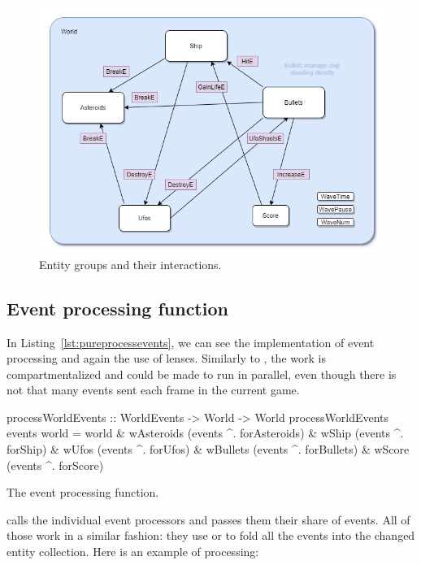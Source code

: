 \documentclass[
  digital, %
  color,   %
  table,   %
  oneside, %
  lof,     %
  lot,     %
]{fithesis3}
\begin{document}
{%
\begin{figure}
    \centering
    \includegraphics[width=\textwidth]{images/entity-relationships-transparent-bg.png}
    \caption{Entity groups and their interactions.}
    \label{fig:entitygroups}
\end{figure}



\subsection{Event processing function}

In Listing~\ref{lst:pureprocessevents}, we can see the implementation of
event processing and again the use of lenses.
Similarly to , the work is compartmentalized
and could be made to run in parallel, even though there is not that many
events sent each frame in the current game.
\begin{listing}
\begin{haskell}
processWorldEvents :: WorldEvents -> World -> World
processWorldEvents events world =
    world
      & wAsteroids %
                        (events ^. forAsteroids)
      & wShip      %
                        (events ^. forShip)
      & wUfos      %
                        (events ^. forUfos)
      & wBullets   %
                        (events ^. forBullets)
      & wScore     %
                        (events ^. forScore)
\end{haskell}
\caption{The event processing function.}
\label{lst:pureprocessevents}
\end{listing}
 calls the individual event processors and passes them
their share of events. All of those work in a similar fashion: they use 
or  to fold all the events into the changed entity collection.
Here is an example of  processing:

}
\end{document}
